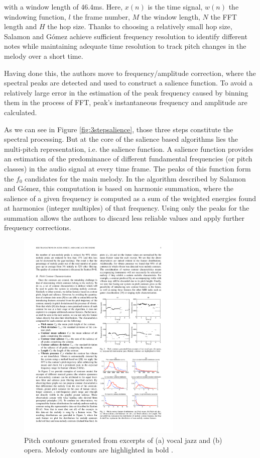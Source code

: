 with a window length of 46.4ms. Here, $x(n)$ is the time signal, $w(n)$ the windowing function, $l$ the frame number, $M$ the window length, $N$ the FFT length and $H$ the hop size. Thanks to choosing a relatively small hop size, Salamon and G\'{o}mez achieve sufficient frequency resolution to identify different notes while maintaining adequate time resolution to track pitch changes in the melody over a short time. 

Having done this, the authors move to frequency/amplitude correction, where the spectral peaks are detected and used to construct a salience function. To avoid a relatively large error in the estimation of the peak frequency caused by binning them in the process of FFT, peak’s instantaneous frequency and amplitude are calculated. 

As we can see in Figure \ref{fig:3stepsalience}, those three steps constitute the spectral processing. But at the core of the salience based algorithms lies the multi-pitch representation, i.e. the salience function. A salience function provides an estimation of the predominance of different fundamental frequencies (or pitch classes) in the audio signal at every time frame. The peaks of this function form the $f_{0}$ candidates for the main melody. In the algorithm described by Salamon and G\'{o}mez, this computation is based on harmonic summation, where the salience of  a given frequency is computed as a sum of the weighted energies found at harmonics (integer multiples) of that frequency. Using only the peaks for the summation allows the authors to discard less reliable values and apply further frequency corrections. 

\begin{figure}[t]
  \centering
    \includegraphics[width=0.7\textwidth]{Figures/pitchcontour}
      \caption{Pitch contours generated from excerpts of (a) vocal jazz and (b) opera. Melody contours are highlighted in bold \cite{salamon}.}
\label{fig:pitchcontours}
\end{figure}

